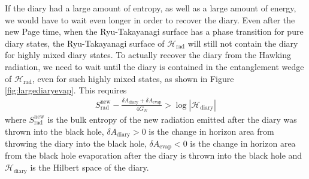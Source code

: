 \documentclass[11pt,a4paper]{article}
\begin{document}
If the diary had a large amount of entropy, as well as a large amount of energy, we would have to wait even longer in order to recover the diary. Even after the new Page time, when the Ryu-Takayanagi surface has a phase transition for pure diary states, the Ryu-Takayanagi surface of $\mathcal{H}_\text{rad}$ will still not contain the diary for highly mixed diary states. To actually recover the diary from the Hawking radiation, we need to wait until the diary is contained in the entanglement wedge of $\mathcal{H}_\text{rad}$, even for such highly mixed states, as shown in Figure \ref{fig:largediaryevap}. This requires
\begin{align} \label{eq:largediarycondition}
S_\text{rad}^\text{new} - \frac{\delta A_\text{diary} + \delta A_\text{evap}}{4G_N} > \log |\mathcal{H}_\text{diary}|
\end{align}
where $S_\text{rad}^\text{new}$ is the bulk entropy of the new radiation emitted after the diary was thrown into the black hole, $\delta A_\text{diary} > 0$ is the change in horizon area from throwing the diary into the black hole, $\delta A_\text{evap} < 0$ is the change in horizon area from the black hole evaporation after the diary is thrown into the black hole  and $\mathcal{H}_\text{diary}$ is the Hilbert space of the diary. 
\end{document}
